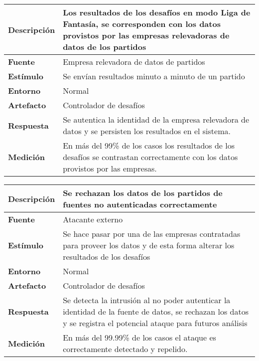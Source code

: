 \begin{center}
  \begin{tabular}{| l | p{10cm} | }
    \hline
	\textbf{Descripción} & Los resultados de los desafíos en modo Liga de Fantasía, se corresponden con los datos provistos por las empresas relevadoras de datos de los partidos\\  \hline
	\textbf{Fuente} & Empresa relevadora de datos de partidos\\  \hline
	\textbf{Estímulo} & Se envían resultados minuto a minuto de un partido\\  \hline
	\textbf{Entorno} & Normal\\  \hline
	\textbf{Artefacto} & Controlador de desafíos\\  \hline
	\textbf{Respuesta} & Se autentica la identidad de la empresa relevadora de datos y se persisten los resultados en el sistema.\\  \hline
	\textbf{Medición} & En más del 99\% de los casos los resultados de los desafíos se contrastan correctamente con los datos provistos por las empresas.\\  \hline
  \end{tabular}
\end{center}

\begin{center}
  \begin{tabular}{| l | p{10cm} | }
    \hline
	\textbf{Descripción} & Se rechazan los datos de los partidos de fuentes no autenticadas correctamente\\  \hline
	\textbf{Fuente} & Atacante externo\\  \hline
	\textbf{Estímulo} & Se hace pasar por una de las empresas contratadas para proveer los datos y de esta forma alterar los resultados de los desafíos\\  \hline
	\textbf{Entorno} & Normal\\  \hline
	\textbf{Artefacto} & Controlador de desafíos\\  \hline
	\textbf{Respuesta} & Se detecta la intrusión al no poder autenticar la identidad de la fuente de datos, se rechazan los datos y se registra el potencial ataque para futuros análisis\\  \hline
	\textbf{Medición} & En más del 99.99\% de los casos el ataque es correctamente detectado y repelido.\\  \hline
  \end{tabular}
\end{center}    


